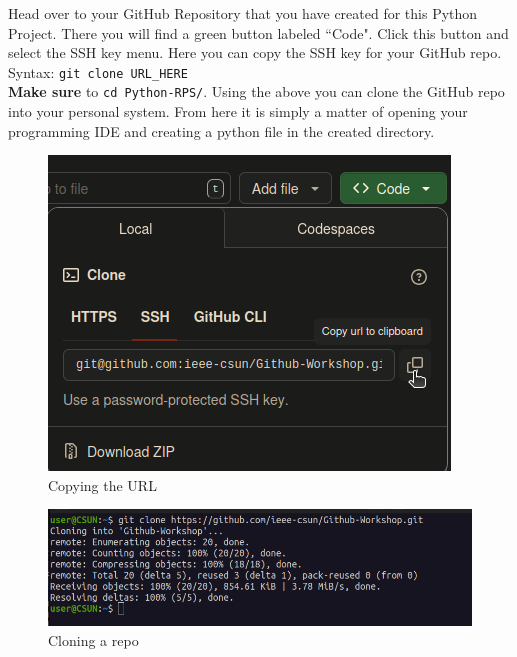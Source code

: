 \documentclass[12pt, a4paper]{article}
\begin{document}
Head over to your GitHub Repository that you have created for this Python Project. There you will find a green button labeled ``Code". Click this button and select the SSH key menu. Here you can copy the SSH key for your GitHub repo. \\

Syntax: \texttt{git clone URL\_HERE}\\

\noindent \textbf{Make sure} to \texttt{cd Python-RPS/}. Using the above you can clone the GitHub repo into your personal system. From here it is simply a matter of opening your programming IDE and creating a python file in the created directory.
\begin{figure}[H]
\centering
\includegraphics[scale=0.5]{../images/workshop-I/GH-URL.png}
\caption{Copying the URL}
\end{figure}
\begin{figure}[H]
\centering
\includegraphics[scale=0.5]{../images/workshop-I/git-clone.png}
\caption{Cloning a repo}
\end{figure}
\end{document}
